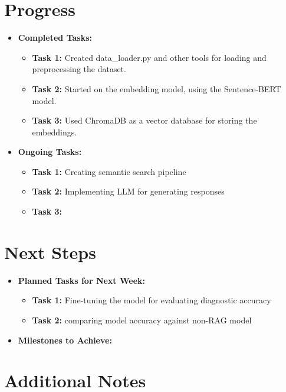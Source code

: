 \documentclass[12pt]{article}
\begin{document}
\section*{Progress}
\begin{itemize}
    \item \textbf{Completed Tasks:}
    \begin{itemize}[leftmargin=*]
        \item \textbf{Task 1:} Created data\_loader.py and other tools for loading and preprocessing the dataset.
        \item \textbf{Task 2:} Started on the embedding model, using the Sentence-BERT model.
        \item \textbf{Task 3:} Used ChromaDB as a vector database for storing the embeddings.
    \end{itemize}
    \item \textbf{Ongoing Tasks:}
    \begin{itemize}[leftmargin=*]
        \item \textbf{Task 1:} Creating semantic search pipeline
        \item \textbf{Task 2:} Implementing LLM for generating responses
        \item \textbf{Task 3:} 
    \end{itemize}
\end{itemize}

\newpage

\section*{Next Steps}
\begin{itemize}
    \item \textbf{Planned Tasks for Next Week:}
    \begin{itemize}[leftmargin=*]
        \item \textbf{Task 1:} Fine-tuning the model for evaluating diagnostic accuracy
        \item \textbf{Task 2:} comparing model accuracy against non-RAG model
    \end{itemize}
    \item \textbf{Milestones to Achieve:}
\end{itemize}

\section*{Additional Notes}
\end{document}
